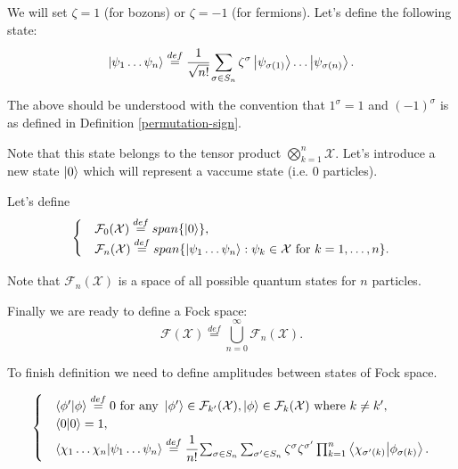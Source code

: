 \documentclass[main.tex]{subfiles}
\begin{document}
We will set $\zeta = 1$ (for bozons) or $\zeta = -1$ (for fermions). Let's define the following state:
\begin{equation}
\ket{\psi_1 \dots \psi_n} \stackrel{def}{=} \cfrac{1}{\sqrt{n!}}\sum_{\sigma\in S_n} \zeta^\sigma 
\ket{\psi_{\sigma(1)}} \dots \ket{\psi_{\sigma(n)}}. 
\end{equation}

The above should be understood with the convention that $1^\sigma = 1$ and $(-1)^\sigma$ is as defined in Definition \ref{permutation-sign}.

Note that this state belongs to the tensor product $\bigotimes_{k = 1}^n \mathcal{X}$. Let's introduce a new state $\ket{0}$ which will represent a vaccume state (i.e. 0 particles).

Let's define 
\begin{equation}
\begin{cases}
& \mathcal{F}_0(\mathcal{X}) \stackrel{def}{=} span\{{\ket{0}}\}, \\
& \mathcal{F}_n(\mathcal{X}) \stackrel{def}{=} span\{\ket{\psi_1 \dots \psi_n} : \psi_k\in \mathcal{X} \text{ for } k = 1, \dots, n\}.
\end{cases}
\end{equation}

Note that $\mathcal{F}_n (\mathcal{X})$ is a space of all possible quantum states for $n$ particles.

Finally we are ready to define a Fock space:
\begin{equation}
\mathcal{F}(\mathcal{X}) \stackrel{def}{=} \bigcup_{n=0}^\infty \mathcal{F}_n(\mathcal{X}).
\end{equation}

To finish definition we need to define amplitudes between states of Fock space.
\begin{definition}
\begin{equation}
\begin{cases}
&\bra{\phi'}\ket{\phi} \stackrel{def}{=} 0
\text{ for any }\ket{\phi'} \in\mathcal{F}_{k'} (\mathcal{X}), \ket{\phi} \in\mathcal{F}_{k} (\mathcal{X}) \text{ where } k\not=k', \\

&\bra{0}\ket{0} = 1, \\

&\bra{\chi_1\dots\chi_n} \ket{\psi_1\dots \psi_n} \stackrel{def}{=} 
\cfrac{1}{n!} \sum_{\sigma\in S_n} \sum_{\sigma'\in S_n} \zeta^\sigma \zeta^{\sigma'}
\prod_{k=1}^n \bra{\chi_{\sigma'(k)}}\ket{\phi_{\sigma(k)}}.
\end{cases}
\end{equation}
\end{definition}
\end{document}
